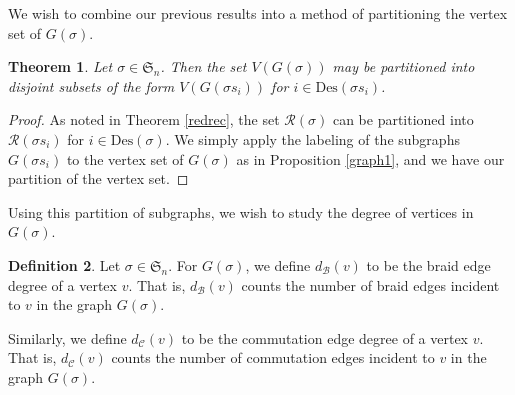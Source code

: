 \documentclass[11pt,reqno]{amsart}
\newtheorem{theorem}{Theorem}[section]
\theoremstyle{definition}
\newtheorem{definition}[theorem]{Definition}
\theoremstyle{notation}
\newcommand{\Des}{\text{Des}}
\newcommand{\calR}{\mathcal{R}}
\newcommand{\calB}{\mathcal{B}}
\newcommand{\calC}{\mathcal{C}}
\newcommand{\Sym}{\mathfrak{S}}
\begin{document}
We wish to combine our previous results into a method of partitioning the vertex set of $G(\sigma)$.

\begin{theorem}\label{graph_partition}
     Let $\sigma \in \Sym_n$. Then the set $V(G(\sigma))$ may be partitioned into disjoint subsets of the form $V(G(\sigma s_i))$ for $i\in \Des(\sigma s_i)$.
\end{theorem}
   

\begin{proof}
    As noted in Theorem \ref{redrec}, the set $\calR(\sigma)$ can be partitioned into $\calR(\sigma s_i)$ for $i\in \Des(\sigma)$. We simply apply the labeling of the subgraphs $G(\sigma s_i)$ to the vertex set of $G(\sigma)$ as in Proposition \ref{graph1}, and we have our partition of the vertex set.
\end{proof}

Using this partition of subgraphs, we wish to study the degree of vertices in $G(\sigma)$. 

\begin{definition}
Let $\sigma \in \mathfrak{S}_n$. For $G(\sigma)$, we define $d_\calB(v)$ to be the braid edge degree of a vertex $v$. That is, $d_\calB(v)$ counts the number of braid edges incident to $v$ in the graph $G(\sigma)$.

Similarly, we define $d_\calC(v)$ to be the commutation edge degree of a vertex $v$. That is, $d_\calC(v)$ counts the number of commutation edges incident to $v$ in the graph $G(\sigma)$.
\end{definition}
\end{document}
